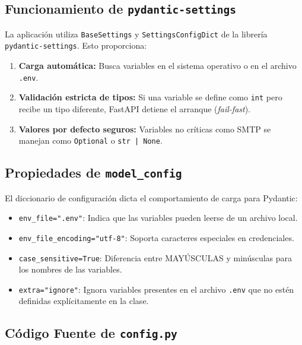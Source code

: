 \documentclass[12pt,a4paper]{article}
\begin{document}
\subsection{Funcionamiento de \texttt{pydantic-settings}}
La aplicación utiliza \texttt{BaseSettings} y \texttt{SettingsConfigDict} de la librería \texttt{pydantic-settings}. Esto proporciona:
\begin{enumerate}
    \item \textbf{Carga automática:} Busca variables en el sistema operativo o en el archivo \texttt{.env}.
    \item \textbf{Validación estricta de tipos:} Si una variable se define como \texttt{int} pero recibe un tipo diferente, FastAPI detiene el arranque (\textit{fail-fast}).
    \item \textbf{Valores por defecto seguros:} Variables no críticas como SMTP se manejan como \texttt{Optional} o \texttt{str | None}.
\end{enumerate}

\subsection{Propiedades de \texttt{model\_config}}
El diccionario de configuración dicta el comportamiento de carga para Pydantic:
\begin{itemize}
    \item \texttt{env\_file=".env"}: Indica que las variables pueden leerse de un archivo local.
    \item \texttt{env\_file\_encoding="utf-8"}: Soporta caracteres especiales en credenciales.
    \item \texttt{case\_sensitive=True}: Diferencia entre MAYÚSCULAS y minúsculas para los nombres de las variables.
    \item \texttt{extra="ignore"}: Ignora variables presentes en el archivo \texttt{.env} que no estén definidas explícitamente en la clase.
\end{itemize}

\subsection{Código Fuente de \texttt{config.py}}
\end{document}
